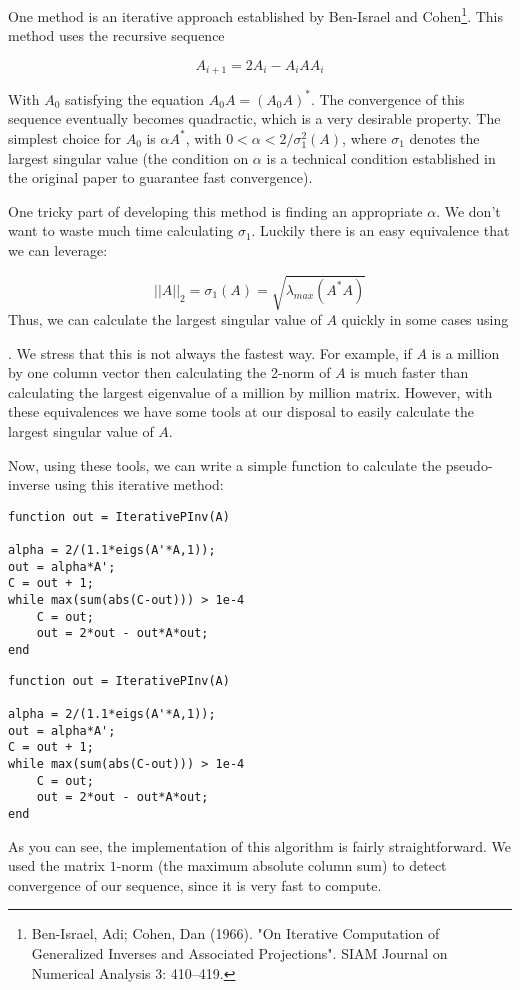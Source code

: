 One method is an iterative approach established by Ben-Israel and Cohen\footnote{Ben-Israel, Adi; Cohen, Dan (1966). "On Iterative Computation of Generalized Inverses and Associated Projections". SIAM Journal on Numerical Analysis 3: 410–419.}. This method uses the recursive sequence

\[
A_{i+1} = 2A_i - A_i A A_i
\]

With $A_0$ satisfying the equation $A_0 A = (A_0 A)^*$. The convergence of this sequence eventually becomes quadractic, which is a very desirable property. The simplest choice for $A_0$ is $\alpha A^*$, with $0 < \alpha < 2/\sigma_1^2(A)$, where $\sigma_1$ denotes the largest singular value (the condition on $\alpha$ is a technical condition established in the original paper to guarantee fast convergence).

One tricky part of developing this method is finding an appropriate $\alpha$. We don't want to waste much time calculating $\sigma_1$. Luckily there is an easy equivalence that we can leverage:

\[
||A||_2 = \sigma_1(A) = \sqrt{\lambda_{max} (A^* A)}
\]
Thus, we can calculate the largest singular value of $A$ quickly in some cases using \begin{matlab}\end{matlab}. We stress that this is not always the fastest way. For example, if $A$ is a million by one column vector then calculating the 2-norm of $A$ is much faster than calculating the largest eigenvalue of a million by million matrix. However, with these equivalences we have some tools at our disposal to easily calculate the largest singular value of $A$.

Now, using these tools, we can write a simple function to calculate the pseudo-inverse using this iterative method:

\begin{matlab}
\begin{lstlisting}[style=matlab]
function out = IterativePInv(A)

alpha = 2/(1.1*eigs(A'*A,1));
out = alpha*A';
C = out + 1;
while max(sum(abs(C-out))) > 1e-4
    C = out;
    out = 2*out - out*A*out;
end
\end{lstlisting}
\end{matlab}
\begin{python}
\begin{lstlisting}[style=python]
function out = IterativePInv(A)

alpha = 2/(1.1*eigs(A'*A,1));
out = alpha*A';
C = out + 1;
while max(sum(abs(C-out))) > 1e-4
    C = out;
    out = 2*out - out*A*out;
end
\end{lstlisting}
\end{python}
As you can see, the implementation of this algorithm is fairly straightforward. We used the matrix $1$-norm (the maximum absolute column sum) to detect convergence of our sequence, since it is very fast to compute.

